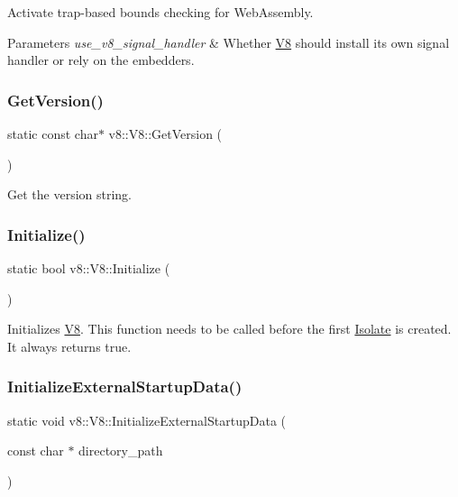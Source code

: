 Activate trap-\/based bounds checking for Web\+Assembly.


\begin{DoxyParams}{Parameters}
{\em use\+\_\+v8\+\_\+signal\+\_\+handler} & Whether \mbox{\hyperlink{classv8_1_1V8}{V8}} should install its own signal handler or rely on the embedder\textquotesingle{}s. \\
\hline
\end{DoxyParams}
\mbox{\label{classv8_1_1V8_afcecc0e9e8b5fa17a06a93f7b5a7538d}} 
\subsubsection{\texorpdfstring{Get\+Version()}{GetVersion()}}
{\footnotesize\ttfamily static const char$\ast$ v8\+::\+V8\+::\+Get\+Version (\begin{DoxyParamCaption}{ }\end{DoxyParamCaption})\hspace{0.3cm}{\ttfamily [static]}}

Get the version string. \mbox{\label{classv8_1_1V8_a40daec93ce44bdd922567fc121be9db8}} 
\subsubsection{\texorpdfstring{Initialize()}{Initialize()}}
{\footnotesize\ttfamily static bool v8\+::\+V8\+::\+Initialize (\begin{DoxyParamCaption}{ }\end{DoxyParamCaption})\hspace{0.3cm}{\ttfamily [static]}}

Initializes \mbox{\hyperlink{classv8_1_1V8}{V8}}. This function needs to be called before the first \mbox{\hyperlink{classv8_1_1Isolate}{Isolate}} is created. It always returns true. \mbox{\label{classv8_1_1V8_ad662ec37263887b7fd31c6b498e9466c}} 
\subsubsection{\texorpdfstring{Initialize\+External\+Startup\+Data()}{InitializeExternalStartupData()}}
{\footnotesize\ttfamily static void v8\+::\+V8\+::\+Initialize\+External\+Startup\+Data (\begin{DoxyParamCaption}\item[{const char $\ast$}]{directory\+\_\+path }\end{DoxyParamCaption})\hspace{0.3cm}{\ttfamily [static]}}

